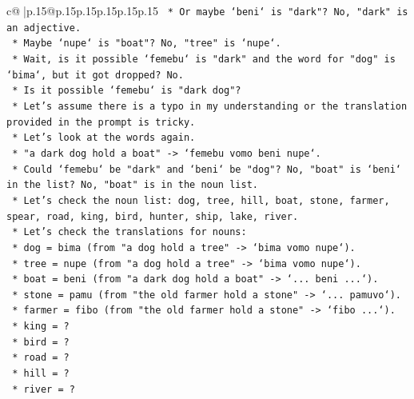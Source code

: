 \documentclass{article}
\begin{document}
{\begin{supertabular}{c@{$\;$}|p{.15\linewidth}@{}p{.15\linewidth}p{.15\linewidth}p{.15\linewidth}p{.15\linewidth}p{.15\linewidth}}
{{{\texttt{                    *   Or maybe `beni` is "dark"? No, "dark" is an adjective.} \\
\texttt{                    *   Maybe `nupe` is "boat"? No, "tree" is `nupe`.} \\
\texttt{                    *   Wait, is it possible `femebu` is "dark" and the word for "dog" is `bima`, but it got dropped? No.} \\
\texttt{                    *   Is it possible `femebu` is "dark dog"?} \\
\texttt{                    *   Let's assume there is a typo in my understanding or the translation provided in the prompt is tricky.} \\
\texttt{                    *   Let's look at the words again.} \\
\texttt{                    *   "a dark dog hold a boat" {-}> `femebu vomo beni nupe`.} \\
\texttt{                    *   Could `femebu` be "dark" and `beni` be "dog"? No, "boat" is `beni` in the list? No, "boat" is in the noun list.} \\
\texttt{                    *   Let's check the noun list: dog, tree, hill, boat, stone, farmer, spear, road, king, bird, hunter, ship, lake, river.} \\
\texttt{                    *   Let's check the translations for nouns:} \\
\texttt{                        *   dog = bima (from "a dog hold a tree" {-}> `bima vomo nupe`).} \\
\texttt{                        *   tree = nupe (from "a dog hold a tree" {-}> `bima vomo nupe`).} \\
\texttt{                        *   boat = beni (from "a dark dog hold a boat" {-}> `... beni ...`).} \\
\texttt{                        *   stone = pamu (from "the old farmer hold a stone" {-}> `... pamuvo`).} \\
\texttt{                        *   farmer = fibo (from "the old farmer hold a stone" {-}> `fibo ...`).} \\
\texttt{                        *   king = ?} \\
\texttt{                        *   bird = ?} \\
\texttt{                        *   road = ?} \\
\texttt{                        *   hill = ?} \\
\texttt{                        *   river = ?} \\
}}}
\end{supertabular}}
\end{document}
